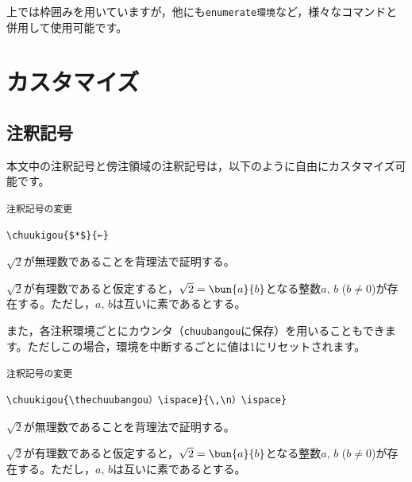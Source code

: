 \documentclass[dvipdfmx,b5j,10pt]{jsarticle}%
\begin{document}
上では枠囲みを用いていますが，他にも\texttt{enumerate環境}など，様々なコマンドと併用して使用可能です。

\section{カスタマイズ}
\subsection{注釈記号}

本文中の注釈記号と傍注領域の注釈記号は，以下のように自由にカスタマイズ可能です。
\begin{itembox}[c]{\texttt{注釈記号の変更}}
\begin{verbatim}
\chuukigou{$*$}{←}
\end{verbatim}
\end{itembox}
\begin{結果}
\begin{chuushaku}
  $\sqrt{2}$が無理数であることを背理法で証明する。\par
  $\sqrt{2}$が有理数であると仮定すると，$\sqrt{2}=\bun{a}{b}$となる整数$a,\,b$ ($b\neq0$)が存在する。ただし，$a,\,b$は互いに素であるとする。
\end{chuushaku}
\end{結果}

また，各注釈環境ごとにカウンタ（\texttt{chuubangou}に保存）を用いることもできます。ただしこの場合，環境を中断するごとに値は1にリセットされます。

\begin{itembox}[c]{\texttt{注釈記号の変更}}
\begin{verbatim}
\chuukigou{\thechuubangou）\ispace}{\,\n）\ispace}
\end{verbatim}
\end{itembox}
\begin{結果}
\begin{chuushaku}
  $\sqrt{2}$が無理数であることを背理法で証明する。\par
  $\sqrt{2}$が有理数であると仮定すると，$\sqrt{2}=\bun{a}{b}$となる整数$a,\,b$ ($b\neq0$)が存在する。ただし，$a,\,b$は互いに素であるとする。
\end{chuushaku}
\end{結果}
\end{document}
